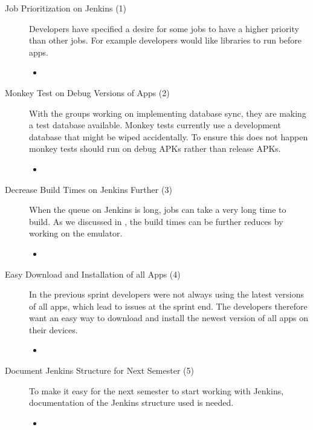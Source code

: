 \begin{description}
  \item[Job Prioritization on Jenkins (1)] Developers have specified a desire for some jobs to have a higher priority than other jobs. For example developers would like libraries to run before apps.
  \begin{itemize}
    \item {}
  \end{itemize}
  \item[Monkey Test on Debug Versions of Apps (2)] With the \db groups working on implementing database sync, they are making a test database available. Monkey tests currently use a development database that might be wiped accidentally. To ensure this does not happen monkey tests should run on debug APKs rather than release APKs.
  \begin{itemize}
    \item {}
  \end{itemize}
  \item[Decrease Build Times on Jenkins Further (3)] When the queue on Jenkins is long, jobs can take a very long time to build. As we discussed in , the build times can be further reduces by working on the emulator.
  \begin{itemize}
    \item {}
  \end{itemize}
  \item[Easy Download and Installation of all Apps (4)] In the previous sprint developers were not always using the latest versions of all apps, which lead to issues at the sprint end. The developers therefore want an easy way to download and install the newest version of all apps on their devices.
  \begin{itemize}
    \item {}
  \end{itemize}
  \item[Document Jenkins Structure for Next Semester (5)] To make it easy for the next semes\-ter to start working with Jenkins, documentation of the Jenkins structure used is needed.
  \begin{itemize}
    \item {}
  \end{itemize}
\end{description}

